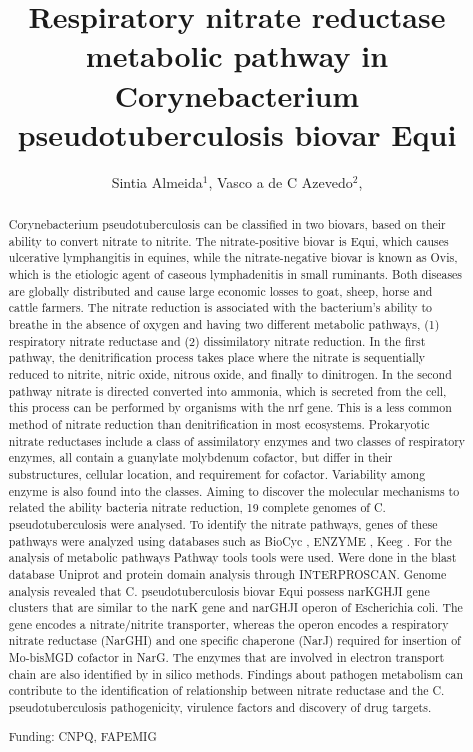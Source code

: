 \documentclass[twoside]{article}
\title{\vspace{-15mm}\fontsize{24pt}{10pt}\selectfont\textbf{ Respiratory nitrate reductase metabolic pathway in Corynebacterium pseudotuberculosis biovar Equi }} %
\author{ Sintia Almeida$^{1}$, Vasco a de C Azevedo$^{2}$, }
\affil{ 1 University of São Paulo

2 Federal University of Minas Gerais

 }
\date{}
\begin{document}
  
  
  \maketitle %
  
  
  \thispagestyle{fancy} %
  
  
  \begin{abstract}
  Corynebacterium pseudotuberculosis can be classified in two biovars, based on their ability to convert nitrate to nitrite. The nitrate-positive biovar is Equi, which causes ulcerative lymphangitis in equines, while the nitrate-negative biovar is known as Ovis, which is the etiologic agent of caseous lymphadenitis in small ruminants. Both diseases are globally distributed and cause large economic losses to goat, sheep, horse and cattle farmers. 
The nitrate reduction is associated with the bacterium's ability to breathe in the absence of oxygen and having two different metabolic pathways, (1) respiratory nitrate reductase and (2) dissimilatory nitrate reduction. In the first pathway, the denitrification process takes place where the nitrate is sequentially reduced to nitrite, nitric oxide, nitrous oxide, and finally to dinitrogen. In the second pathway nitrate is directed converted into ammonia, which is secreted from the cell, this process can be performed by organisms with the nrf gene. This is a less common method of nitrate reduction than denitrification in most ecosystems. Prokaryotic nitrate reductases include a class of assimilatory enzymes and two classes of respiratory enzymes, all contain a guanylate molybdenum cofactor, but differ in their substructures, cellular location, and requirement for cofactor. Variability among enzyme is also found into the classes. 
Aiming to discover the molecular mechanisms to related the ability bacteria nitrate reduction, 19 complete genomes of C. pseudotuberculosis were analysed. To identify the nitrate pathways, genes of these pathways were analyzed using databases such as BioCyc , ENZYME , Keeg . For the analysis of metabolic pathways Pathway tools tools were used. Were done in the blast database Uniprot and protein domain analysis through  INTERPROSCAN. 
Genome analysis revealed that C. pseudotuberculosis biovar Equi possess narKGHJI gene clusters that are similar to the narK gene and narGHJI operon of Escherichia coli. The gene encodes a nitrate/nitrite transporter, whereas the operon encodes a respiratory nitrate reductase (NarGHI) and one specific chaperone (NarJ) required for insertion of Mo-bisMGD cofactor in NarG.
The enzymes that are involved in electron transport chain are also identified by in silico methods. Findings about pathogen metabolism can contribute to the identification of relationship between nitrate reductase and the C. pseudotuberculosis pathogenicity, virulence factors and discovery of drug targets.
  
  Funding: CNPQ, FAPEMIG \\ 
  \end{abstract}
  
\end{document}
